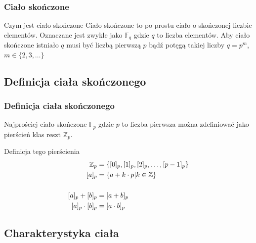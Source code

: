 \documentclass{beamer}
\newcommand{\modulo}[1]{\mathbb{Z}_{#1}}
\begin{document}
\begin{frame}
	\frametitle{Ciało skończone}
    \begin{exampleblock}{Czym jest ciało skończone}
        Ciało skończone to po prostu ciało o skończonej liczbie elementów.
        Oznaczane jest zwykle jako $\mathbb{F}_q$ gdzie $q$ to liczba elementów.
        Aby ciało skończone istniało $q$ musi być liczbą pierwszą $p$ bądź potęgą
        takiej liczby $q=p^m$, $m \in \{ 2, 3, \ldots \}$
    \end{exampleblock}
\end{frame}

\subsection{Definicja ciała skończonego}
\begin{frame}
	\frametitle{Definicja ciała skończonego}

	Najprościej ciało skończone $\mathbb{F}_p$ gdzie $p$ to liczba pierwsza
	można zdefiniować jako pierścień klas reszt $\modulo{p}$.
	\begin{exampleblock}{Definicja tego pierścienia}
        \begin{align*}
            \modulo{p} &= \{ [0]_p, [1]_p, [2]_p, \ldots, [p-1]_p \} \\
            [a]_p &= \{ a + k \cdot p | k \in \mathbb{Z} \} \\
            \notag \\
            [a]_p + [b]_p &= [a + b]_p \\
            [a]_p \cdot [b]_p &= [a \cdot b]_p
        \end{align*}
    \end{exampleblock}
\end{frame}

\subsection{Charakterystyka ciała}
\end{document}
